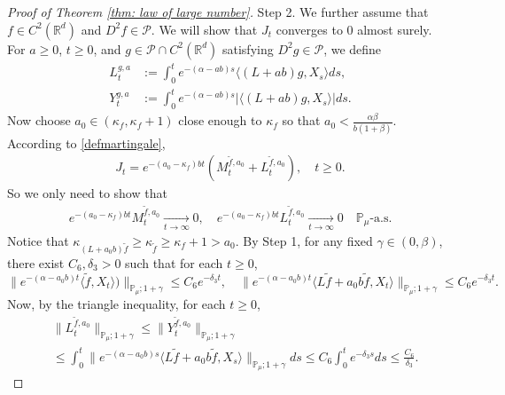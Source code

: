 \documentclass[12pt,a4paper]{amsart}
\theoremstyle{plain}
\theoremstyle{definition}
\numberwithin{equation}{section}
\begin{document}
\begin{proof}[Proof of Theorem \ref{thm: law of large number}]
	Step 2.
    We further assume that $f\in C^2(\mathbb R^d)$ and $D^2f \in \mathcal{P}$.
    We will show that $J_t$ converges to $0$ almost surely.
	For $a \geq 0$, $ t\geq 0$, and $g\in \mathcal{P}\cap C^2(\mathbb{R}^d)$ satisfying $D^2g\in \mathcal{P}$, we define
\begin{align*}
	L_t^{g,a}&:=\int_0^t e^{-(\alpha-ab)s}\langle (L+ab)g,X_s\rangle ds,\\
    Y_t^{g,a}
    &:=\int_0^t e^{-(\alpha-ab)s}|\langle (L+ab)g,X_s\rangle|ds.
\end{align*}
	Now choose $a_0 \in (\kappa_{f}, \kappa_f + 1)$ close enough to $\kappa_f$ so that $a_0 < \frac{\alpha \beta}{b(1+\beta)}$.
	According to \eqref{defmartingale}, 
\begin{align}
    J_t
    =e^{-(a_0-\kappa_f)bt} (M_t^{\widetilde{f}, a_0}+L_t^{\widetilde{f}, a_0}),
    \quad t\geq 0.
\end{align}
	So we only need to show that
\begin{align}
    e^{-(a_0-\kappa_f)b t}M_t^{\widetilde{f},a_0}
    \xrightarrow[t\to \infty]{} 0,
    \quad e^{-(a_0-\kappa_f)b t}L_t^{\widetilde{f},a_0}
    \xrightarrow[t\to \infty]{} 0
    \quad \mathbb{P}_{\mu}\text{-a.s.}
\end{align}
    Notice that $\kappa_{(L+a_0 b)\widetilde{f}}\geq \kappa_{\widetilde{f}}\geq \kappa_f+1 > a_0$.
By Step 1, for any fixed $\gamma\in (0,\beta)$, there exist $C_6, \delta_3>0$ such that for each $t\geq 0$,
\begin{equation}
    \|e^{-(\alpha-a_0 b)t}\langle \widetilde{f},X_t\rangle)\|_{\mathbb{P}_{\mu};1+\gamma}
    \leq C_6 e^{-\delta_3 t},
    \quad \|e^{-(\alpha-a_0 b)t}\langle L\widetilde{f}+a_0 b\widetilde{f},X_t\rangle\|_{\mathbb{P}_{\mu};1+\gamma}
    \leq C_6 e^{-\delta_3 t}.
\end{equation}
	Now, by the triangle inequality, for each $t\geq 0$,
\begin{align}
    &\|L_t^{\widetilde{f},a_0}\|_{\mathbb{P}_{\mu};1+\gamma}
    \leq\|Y_t^{\widetilde{f},a_0}\|_{\mathbb{P}_{\mu};1+\gamma}
    \\&
    \leq \int_0^t \|e^{-(\alpha-a_0 b)s}\langle L\widetilde{f}+a_0 b\widetilde{f},X_s\rangle\|_{\mathbb{P}_{\mu};1+\gamma}ds\leq C_6 \int_0^t e^{-\delta_3 s}ds\leq\frac{C_6}{\delta_3}.
\end{align}

\end{proof}
\end{document}
